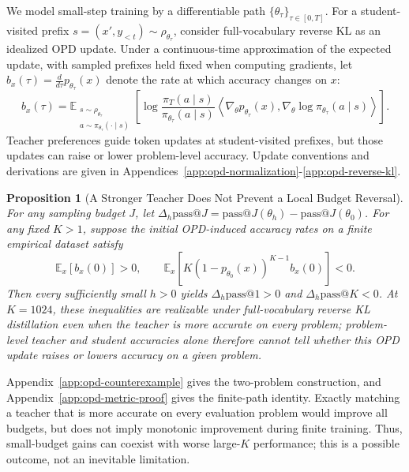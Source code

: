 \documentclass{article}
\theoremstyle{opdplain}
\newtheorem{proposition}{Proposition}
\begin{document}
We model small-step training by a differentiable path $\{\theta_\tau\}_{\tau\in[0,T]}$. For a student-visited prefix $s=(x',y_{<t})\sim\rho_{\theta_\tau}$, consider full-vocabulary reverse KL as an idealized OPD update. Under a continuous-time approximation of the expected update, with sampled prefixes held fixed when computing gradients, let $b_x(\tau)=\frac{d}{d\tau}p_{\theta_\tau}(x)$ denote the rate at which accuracy changes on $x$:
\begin{equation}
\label{eq:opd-rate-identity}
 b_x(\tau)=\mathbb E_{\substack{s\sim\rho_{\theta_\tau}\\a\sim\pi_{\theta_\tau}(\cdot\mid s)}}
 \!\left[\log\frac{\pi_T(a\mid s)}{\pi_{\theta_\tau}(a\mid s)}
 \left\langle\nabla_\theta p_{\theta_\tau}(x),\nabla_\theta\log\pi_{\theta_\tau}(a\mid s)\right\rangle\right].
\end{equation}
Teacher preferences guide token updates at student-visited prefixes, but those updates can raise or lower problem-level accuracy. Update conventions and derivations are given in Appendices~\ref{app:opd-normalization}-\ref{app:opd-reverse-kl}.

\begin{proposition}[A Stronger Teacher Does Not Prevent a Local Budget Reversal]
\label{prop:opd-teacher-nonmonotone}
For any sampling budget $J$, let $\Delta_h\mathrm{pass}@J=\mathrm{pass}@J(\theta_h)-\mathrm{pass}@J(\theta_0)$. For any fixed $K>1$, suppose the initial OPD-induced accuracy rates on a finite empirical dataset satisfy
\begin{equation}
\label{eq:opd-local-reversal}
 \mathbb E_x[b_x(0)]>0,
 \qquad
 \mathbb E_x\!\left[K(1-p_{\theta_0}(x))^{K-1}b_x(0)\right]<0.
\end{equation}
Then every sufficiently small $h>0$ yields $\Delta_h\mathrm{pass}@1>0$ and $\Delta_h\mathrm{pass}@K<0$. At $K=1024$, these inequalities are realizable under full-vocabulary reverse KL distillation even when the teacher is more accurate on every problem; problem-level teacher and student accuracies alone therefore cannot tell whether this OPD update raises or lowers accuracy on a given problem.
\end{proposition}

Appendix~\ref{app:opd-counterexample} gives the two-problem construction, and Appendix~\ref{app:opd-metric-proof} gives the finite-path identity. Exactly matching a teacher that is more accurate on every evaluation problem would improve all budgets, but does not imply monotonic improvement during finite training. Thus, small-budget gains can coexist with worse large-$K$ performance; this is a possible outcome, not an inevitable limitation.
\end{document}
